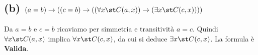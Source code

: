 \subsection*{(b) $(a=b) \to ((c=b) \to ((\forall x \st C(a,x)) \to (\exists x \st C(c,x))))$}
Da $a=b$ e $c=b$ ricaviamo per simmetria e transitività $a=c$. Quindi $\forall x \st C(a,x)$ implica $\forall x \st C(c,x)$, da cui si deduce $\exists x \st C(c,x)$. La formula è \textbf{Valida}.

\begin{prooftree}
  \small
\end{prooftree}
